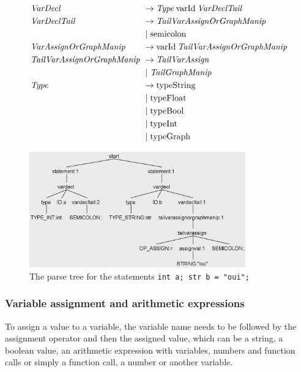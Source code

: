 \begin{align*}
    \omit $\mathit{VarDecl}$ \hfil& \rightarrow \mathit{Type} \: \text{varId} \: \mathit{VarDeclTail} \\
    \omit $\mathit{VarDeclTail}$ \hfil & \rightarrow \mathit{TailVarAssignOrGraphManip} \\
    & \mid \text{semicolon} \\
    \omit $\mathit{VarAssignOrGraphManip}$\hfil & \rightarrow \text{varId} \: \mathit{TailVarAssignOrGraphManip} \\
    \omit $\mathit{TailVarAssignOrGraphManip}$ & \rightarrow \mathit{TailVarAssign} \\
    & \mid  \mathit{TailGraphManip}\ \\
    \omit $\mathit{Type}$ \hfil & \rightarrow \text{typeString} \\
    & \mid \text{typeFloat} \\
    & \mid \text{typeBool} \\
    & \mid \text{typeInt}\\
    & \mid \text{typeGraph}
\end{align*}

\begin{figure}[H]
    \centering
    \includegraphics[height = 5cm]{figures/parse_trees/parseTree_varDecl}
    \caption{The parse tree for the statements \texttt{int a;
    str b = "oui";}}
    \label{fig:parseTree_varDecl}
\end{figure}

\subsubsection*{Variable assignment and arithmetic expressions}
To assign a value to a variable, the variable name needs to be followed by the assignment operator and then the assigned value, which can be a string, a boolean value, an arithmetic expression with variables, numbers and function calls or simply a function call, a number or another variable.

